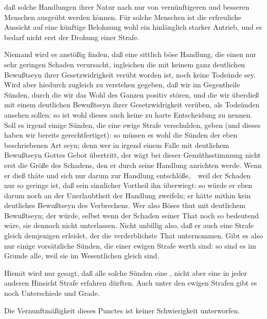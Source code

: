 \begin{aufza}
\begin{aufzb}
\begin{aufzc}
\item daß solche Handlungen ihrer Natur nach nur von vernünftigeren und besseren Menschen ausgeübt werden können. Für solche Menschen ist die erfreuliche Aussicht auf eine künftige Belohnung wohl ein hinlänglich starker Antrieb, und es bedarf nicht erst der Drohung einer Strafe.
\end{aufzc}
\item Niemand wird es anstößig finden, daß eine sittlich böse Handlung, die einen nur sehr geringen Schaden verursacht, ingleichen die mit keinem ganz deutlichen Bewußtseyn ihrer Gesetzwidrigkeit verübt worden ist, noch keine Todsünde sey. Wird aber hiedurch zugleich zu verstehen gegeben, daß wir im Gegentheile Sünden, durch die wir das Wohl des Ganzen positiv stören, und die wir überdieß mit einem deutlichen Bewußtseyn ihrer Gesetzwidrigkeit verüben, als Todsünden ansehen sollen: so ist wohl dieses auch keine zu harte Entscheidung zu nennen. Soll es irgend einige Sünden, die eine ewige Strafe verschulden, geben (und dieses haben wir bereits gerechtfertiget): so müssen es wohl die Sünden der eben beschriebenen Art seyn; denn wer in irgend einem Falle mit deutlichem Bewußtseyn Gottes Gebot übertritt, der wägt bei dieser Gemüthsstimmung nicht erst die Größe des Schadens, den er durch seine Handlung anrichten werde. Wenn er dieß thäte und sich nur darum zur Handlung entschlöße,~\ weil der Schaden nur so geringe ist, daß sein sinnlicher Vortheil ihn überwiegt: so würde er eben darum noch an der Unerlaubtheit der Handlung zweifeln; er hätte mithin kein deutliches Bewußtseyn des Verbrechens. Wer also Böses thut mit deutlichem Bewußtseyn; der würde, selbst wenn der Schaden seiner That noch so bedeutend wäre, sie dennoch nicht unterlassen. Nicht unbillig also, daß er auch eine Strafe gleich demjenigen erleidet, der die verderblichste That unternommen. Gibt es also nur einige vorsätzliche Sünden, die einer ewigen Strafe werth sind: so sind es im Grunde alle, weil sie im Wesentlichen gleich sind.
\begin{RWanm} 
Hiemit wird nur gesagt, daß alle solche Sünden eine , nicht aber eine in jeder anderen Hinsicht  Strafe erfahren dürften. Auch unter den ewigen Strafen gibt es noch Unterschiede und Grade. 
\end{RWanm}
\end{aufzb}
\item Die Vernunftmäßigkeit dieses Punctes ist keiner Schwierigkeit unterworfen.

\end{aufza}
